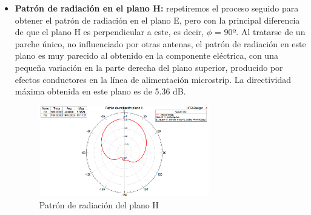 \begin{itemize}
\item \textbf{Patrón de radiación en el plano H: }repetiremos el proceso seguido para obtener el patrón de radiación en el plano E, pero con la principal diferencia de que el plano H es perpendicular a este, es decir, $\phi $ = 90º. Al tratarse de un parche único, no influenciado por otras antenas, el patrón de radiación en este plano es muy parecido al obtenido en la componente eléctrica, con una pequeña variación en la parte derecha del plano superior, producido por efectos conductores en la línea de alimentación microstrip. La directividad máxima obtenida en este plano es de 5.36 dB.
	\begin{figure}[H]
    \centering
        \includegraphics[width=0.7\textwidth]{archivos/analisis/1x11/5}
        \caption{Patrón de radiación del plano H}
        \label{fig:radH}
	\end{figure}


\end{itemize}
